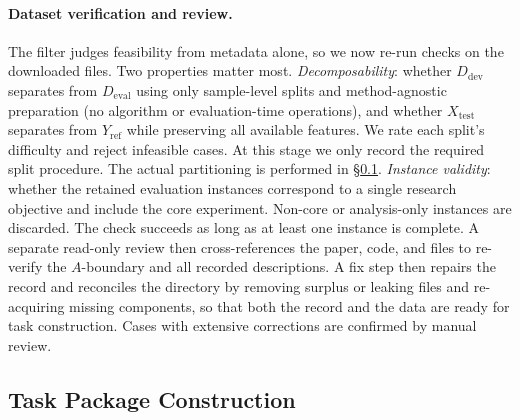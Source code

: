 \paragraph{Dataset verification and review.}
The filter judges feasibility from metadata alone, so we now re-run checks on the downloaded files. Two properties matter most.
\emph{Decomposability}: whether $D_\text{dev}$ separates from $D_\text{eval}$ using only sample-level splits and method-agnostic preparation (no algorithm or evaluation-time operations), and whether $X_\text{test}$ separates from $Y_\text{ref}$ while preserving all available features. We rate each split’s difficulty and reject infeasible cases. At this stage we only record the required split procedure. The actual partitioning is performed in \S\ref{sec:gym:build}.
\emph{Instance validity}: whether the retained evaluation instances correspond to a single research objective and include the core experiment. Non-core or analysis-only instances are discarded.
The check succeeds as long as at least one instance is complete.
A separate read-only review then cross-references the paper, code, and files to re-verify the $A$-boundary and all recorded descriptions. A fix step then repairs the record and reconciles the directory by removing surplus or leaking files and re-acquiring missing components, so that both the record and the data are ready for task construction. Cases with extensive corrections are confirmed by manual review.



\subsection{Task Package Construction}
\label{sec:gym:build}


